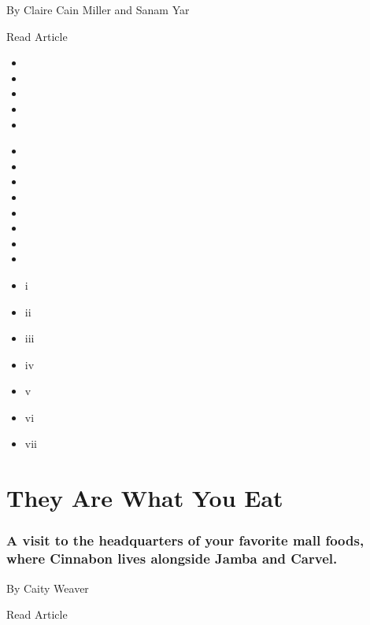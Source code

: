 By Claire Cain Miller and Sanam Yar

Read Article

\begin{itemize}
\item
\item
\item
\item
\item
\end{itemize}

\begin{itemize}
\item
\item
\item
\item
\item
\item
\item
\item
\end{itemize}

\begin{itemize}
\item
  i
\item
  ii
\item
  iii
\item
  iv
\item
  v
\item
  vi
\item
  vii
\end{itemize}

\href{https://www.nytimes3xbfgragh.onion/2019/09/17/style/moes-cinnabon-focus-brands.html}{}

\hypertarget{they-are-what-you-eat}{%
\section{They Are What You Eat}\label{they-are-what-you-eat}}

\hypertarget{a-visit-to-the-headquarters-of-your-favorite-mall-foods-where-cinnabon-lives-alongside-jamba-and-carvel}{%
\subsubsection{A visit to the headquarters of your favorite mall foods,
where Cinnabon lives alongside Jamba and
Carvel.}\label{a-visit-to-the-headquarters-of-your-favorite-mall-foods-where-cinnabon-lives-alongside-jamba-and-carvel}}

By Caity Weaver

Read Article

